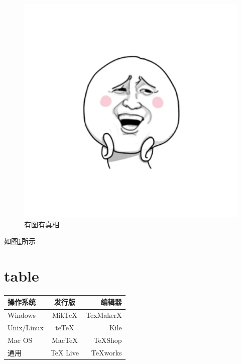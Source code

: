 \documentclass[UTF8]{ctexart}
\begin{document}
\begin{figure}[htbp]
\centering
\includegraphics{a.png}
\caption{有图有真相}
\label{fig:myphoto}
\end{figure}

如图\ref{fig:myphoto}所示

\section{table}

\begin{tabular}{|l|c|r|}
 \hline
操作系统& 发行版& 编辑器\\
 \hline
Windows & MikTeX & TexMakerX \\
 \hline
Unix/Linux & teTeX & Kile \\
 \hline
Mac OS & MacTeX & TeXShop \\
 \hline
通用& TeX Live & TeXworks \\
 \hline
\end{tabular}
\end{document}
